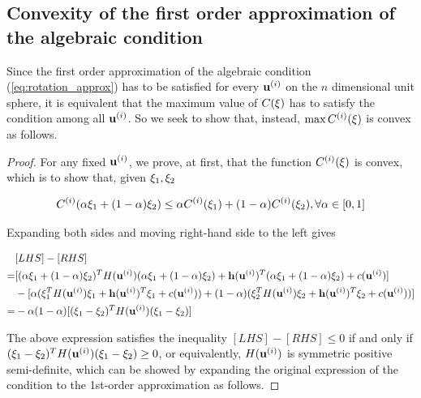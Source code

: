 \documentclass{article}
\begin{document}
\subsection{Convexity of the first order approximation of the algebraic condition}
Since the first order approximation of the algebraic condition (\ref{eq:rotation_approx}) has to be satisfied for every ${\bf u}^{(i)}$ on the $n$ dimensional unit sphere, it is equivalent that the maximum value of $C({\bf \xi})$ has to satisfy the condition among all ${\bf u}^{(i)}$. So we seek to show that, instead, $\max C^{(i)}({\bf \xi})$ is convex as follows.

\begin{proof}	
For any fixed ${\bf u}^{(i)}$, we prove, at first, that the function $C^{(i)}({\bf \xi})$ is convex, which is to show that, given ${\bf \xi}_1, {\bf \xi}_2$
	
\begin{equation}
\label{proof_convex_ineq}
C^{(i)}(\alpha {\bf \xi}_1 + (1-\alpha) {\bf \xi}_2) \leq \alpha C^{(i)}({\bf \xi}_1) + (1-\alpha) C^{(i)}({\bf \xi}_2),  \forall  \alpha \in [0,1]
\end{equation}
	
Expanding both sides and moving right-hand side to the left gives
	
\begin{equation}
\label{proof_convex_each}
\begin{aligned}
& [LHS]-[RHS] \\
=& [(\alpha {\bf \xi}_1 + (1-\alpha) {\bf \xi}_2)^T H({\bf u}^{(i)}) (\alpha {\bf \xi}_1 + (1-\alpha) {\bf \xi}_2) + {\bf h}({\bf u}^{(i)})^T (\alpha {\bf \xi}_1 + (1-\alpha) {\bf \xi}_2) + c({\bf u}^{(i)})]\\
& - [\alpha ({\bf \xi}_1^T H({\bf u}^{(i)}) {\bf \xi}_1 + {\bf h}({\bf u}^{(i)})^T {\bf \xi}_1 + c({\bf u}^{(i)})) + (1-\alpha)({\bf \xi}_2^T H({\bf u}^{(i)}) {\bf \xi}_2 + {\bf h}({\bf u}^{(i)})^T {\bf \xi}_2 + c({\bf u}^{(i)}))] \\
=& -\alpha(1-\alpha) [({\bf \xi}_1 - {\bf \xi}_2)^T H({\bf u}^{(i)}) ({\bf \xi}_1 - {\bf \xi}_2)]
\end{aligned}
\end{equation}
	
The above expression satisfies the inequality $[LHS]-[RHS] \leq 0$ if and only if $({\bf \xi}_1 - {\bf \xi}_2)^T H({\bf u}^{(i)}) ({\bf \xi}_1 - {\bf \xi}_2) \geq 0$, or equivalently, $H({\bf u}^{(i)})$ is symmetric positive semi-definite, which can be showed by expanding the original expression of the condition to the 1st-order approximation as follows.
	

\end{proof}
\end{document}
